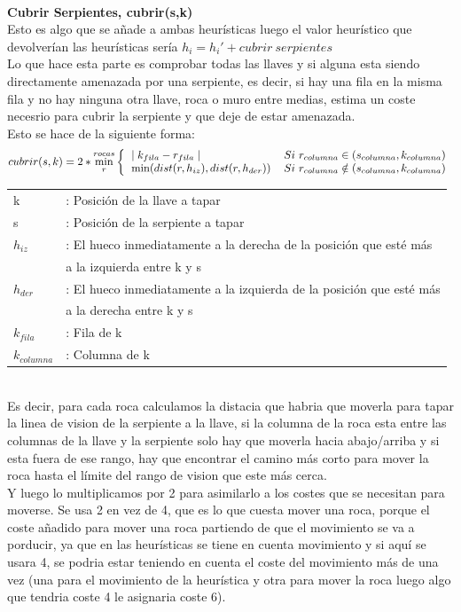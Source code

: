 \documentclass[11pt,spanish]{article}
\begin{document}
			\\
			\textbf{Cubrir Serpientes, cubrir(s,k)}\\
			Esto es algo que se añade a ambas heurísticas luego el valor heurístico que devolverían las heurísticas sería $h_i = h_i'+cubrir\ serpientes$\\
			Lo que hace esta parte es comprobar todas las llaves y si alguna esta siendo directamente amenazada por una serpiente, es decir, si hay una fila en la misma fila y no hay ninguna otra llave, roca o muro entre medias, estima un coste necesrio para cubrir la serpiente y que deje de estar amenazada.\\
			Esto se hace de la siguiente forma:
			\[
				cubrir(s,k) = 2*\min\limits_r^{rocas}
				\bigg \{
				\begin{tabular}{ll}
					$\mid k_{fila}-r_{fila} \mid $& $Si\ r_{columna} \in (s_{columna}, k_{columna})$\\
					$\min(dist(r,h_{iz}),dist(r,h_{der}))$&$ Si\ r_{columna} \notin (s_{columna}, k_{columna})$\\
				\end{tabular}
			\]
			\begin{tabular}{ll}
				k&: Posición de la llave a tapar\\
				s&: Posición de la serpiente a tapar\\
				$h_{iz}$&: El hueco inmediatamente a la derecha de la posición que esté más \\
				&  a la izquierda entre k y s\\
				$h_{der}$&: El hueco inmediatamente a la izquierda de la posición que esté más \\
				&  a la derecha entre k y s\\
				$k_{fila}$&: Fila de k\\
				$k_{columna}$&: Columna de k
			\end{tabular}\\
			Es decir, para cada roca calculamos la distacia que habria que moverla para tapar la linea de vision de la serpiente a la llave, si la columna de la roca esta entre las columnas de la llave y la serpiente solo hay que moverla hacia abajo/arriba y si esta fuera de ese rango, hay que encontrar el camino más corto para mover la roca hasta el límite del rango de vision que este más cerca.\\
			Y luego lo multiplicamos por 2 para asimilarlo a los costes que se necesitan para moverse. Se usa 2 en vez de 4, que es lo que cuesta mover una roca, porque el coste añadido para mover una roca partiendo de que el movimiento se va a porducir, ya que en las heurísticas se tiene en cuenta movimiento y si aquí se usara 4, se podria estar teniendo en cuenta el coste del movimiento más de una vez (una para el movimiento de la heurística y otra para mover la roca luego algo que tendria coste 4 le asignaria coste 6).\\
\end{document}
